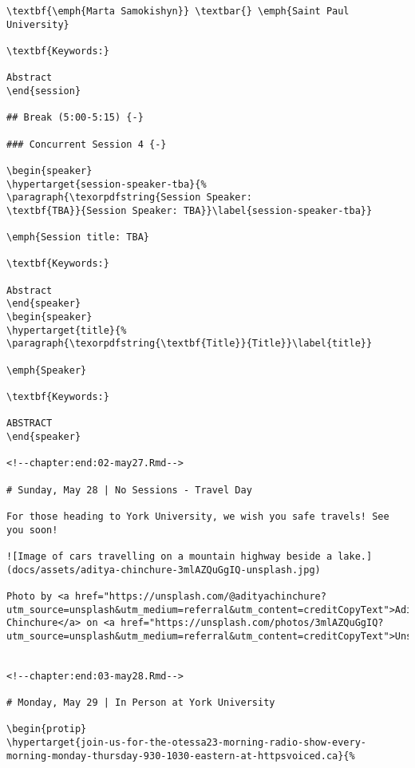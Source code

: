 \documentclass[
]{book}
\begin{document}
\begin{verbatim}
\textbf{\emph{Marta Samokishyn}} \textbar{} \emph{Saint Paul University}

\textbf{Keywords:}

Abstract
\end{session}

## Break (5:00-5:15) {-}

### Concurrent Session 4 {-}

\begin{speaker}
\hypertarget{session-speaker-tba}{%
\paragraph{\texorpdfstring{Session Speaker:
\textbf{TBA}}{Session Speaker: TBA}}\label{session-speaker-tba}}

\emph{Session title: TBA}

\textbf{Keywords:}

Abstract
\end{speaker}
\begin{speaker}
\hypertarget{title}{%
\paragraph{\texorpdfstring{\textbf{Title}}{Title}}\label{title}}

\emph{Speaker}

\textbf{Keywords:}

ABSTRACT
\end{speaker}

<!--chapter:end:02-may27.Rmd-->

# Sunday, May 28 | No Sessions - Travel Day 

For those heading to York University, we wish you safe travels! See you soon!

![Image of cars travelling on a mountain highway beside a lake.](docs/assets/aditya-chinchure-3mlAZQuGgIQ-unsplash.jpg)  

Photo by <a href="https://unsplash.com/@adityachinchure?utm_source=unsplash&utm_medium=referral&utm_content=creditCopyText">Aditya Chinchure</a> on <a href="https://unsplash.com/photos/3mlAZQuGgIQ?utm_source=unsplash&utm_medium=referral&utm_content=creditCopyText">Unsplash</a>
  

<!--chapter:end:03-may28.Rmd-->

# Monday, May 29 | In Person at York University 

\begin{protip}
\hypertarget{join-us-for-the-otessa23-morning-radio-show-every-morning-monday-thursday-930-1030-eastern-at-httpsvoiced.ca}{%

\end{verbatim}
\end{document}
